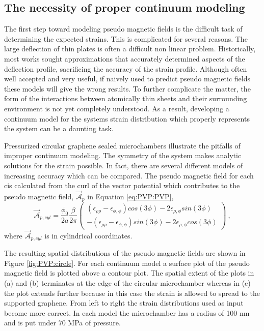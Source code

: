 \subsection{The necessity of proper continuum modeling\label{sec:PVP:GoodCont}}
The first step toward modeling pseudo magnetic fields is the difficult task of determining the expected strains.
This is complicated for several reasons.
The large deflection of thin plates is often a difficult non linear problem.
Historically, most works sought approximations that accurately determined aspects of the deflection profile, sacrificing the accuracy of the strain profile.
Although often well accepted and very useful, if naively used to predict pseudo magnetic fields these models will give the wrong results.
To further complicate the matter, the form of the interactions between atomically thin sheets and their surrounding environment is not yet completely understood.
As a result, developing a continuum model for the systems strain distribution which properly represents the system can be a daunting task.

Pressurized circular graphene sealed microchambers illustrate the pitfalls of improper continuum modeling.
The symmetry of the system makes analytic solutions for the strain possible.
In fact, there are several different models of increasing accuracy which can be compared.
The pseudo magnetic field for each cis calculated from the curl of the vector potential which contributes to the pseudo magnetic field, $\vec{\mathcal{A}}_p$ in Equation \ref{eq:PVP:PVP}, 
\begin{equation*}
\vec{\mathcal{A}}_{p,cyl}=\frac{\phi_0}{2a} \frac{\beta}{2 \pi}
  \left( \begin{array}{c}
    (\epsilon_{\rho\rho}-\epsilon_{\phi,\phi}) cos(3\phi)-2 \epsilon_{\rho,\phi} sin (3 \phi) \\
    -(\epsilon_{\rho\rho}-\epsilon_{\phi,\phi}) sin(3\phi)-2 \epsilon_{\rho,\phi} cos (3 \phi)
  \end{array} \right) \ ,
\end{equation*}
where $\vec{\mathcal{A}}_{p,cyl}$ is in cylindrical coordinates.

The resulting spatial distributions of the pseudo magnetic fields are shown in Figure \ref{fig:PVP:circle}.
For each continuum model a surface plot of the pseudo magnetic field is plotted above a contour plot.
The spatial extent of the plots in (a) and (b) terminates at the edge of the circular microchamber whereas in (c) the plot extends further because in this case the strain is allowed to spread to the supported graphene.
From left to right the strain distributions used as input become more correct.
In each model the microchamber has a radius of 100 nm and is put under 70 MPa of pressure.

